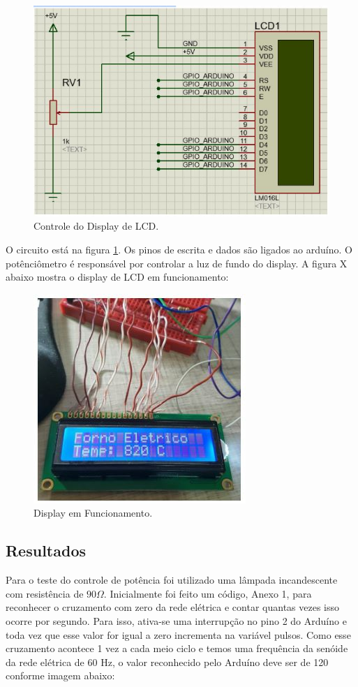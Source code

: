 \begin{figure}[H]
	\centering
	\label{lcd}
	\includegraphics[keepaspectratio=true,scale=0.7]{figuras/lcd.JPG}
	\caption{Controle do Display de LCD.}
\end{figure}

O circuito está na figura \ref{lcd}. Os pinos de escrita e dados são ligados ao arduíno. O potênciômetro é responsável por controlar a luz de fundo do display. A figura X abaixo mostra o display de LCD em funcionamento:

\begin{figure}[H]
	\centering
	\label{display}
	\includegraphics[keepaspectratio=true,scale=1.0]{figuras/display.JPG}
	\caption{Display em Funcionamento.}
\end{figure}

\subsection{Resultados}
Para o teste do controle de potência foi utilizado uma lâmpada incandescente com resistência de $90 \Omega$. Inicialmente foi feito um código, Anexo 1, para reconhecer o cruzamento com zero da rede elétrica e contar quantas vezes isso ocorre por segundo. Para isso, ativa-se uma interrupção no pino 2 do Arduíno e toda vez que esse valor for igual a zero incrementa na variável pulsos. Como esse cruzamento acontece 1 vez a cada meio ciclo e temos uma frequência da senóide da rede elétrica de 60 Hz, o valor reconhecido pelo Arduíno deve ser de 120 conforme imagem abaixo:

